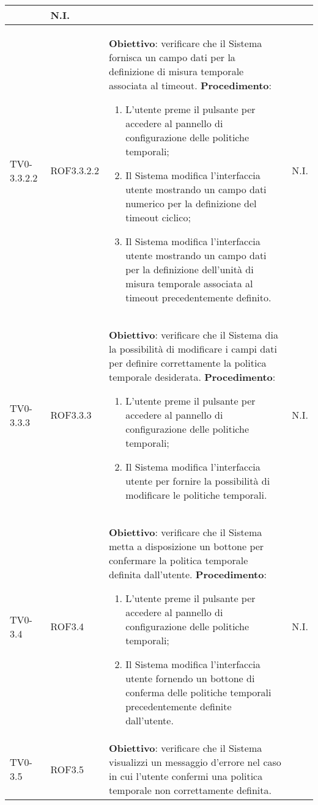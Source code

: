 \begin{longtable}{|C{.15\textwidth}|C{.13\textwidth}|m{.52\textwidth}|C{.08\textwidth}|}
	& N.I. \\
\hline
TV0-3.3.2.2 & ROF3.3.2.2 &
	\textbf{Obiettivo}: verificare che il Sistema fornisca un campo dati per la definizione di misura temporale associata al timeout. \newline
	\textbf{Procedimento}:
	\begin{enumerate}
		\item L'utente preme il pulsante per accedere al pannello di configurazione delle politiche temporali;
		\item Il Sistema modifica l'interfaccia utente mostrando un campo dati numerico per la definizione del timeout ciclico;
		\item Il Sistema modifica l'interfaccia utente mostrando un campo dati per la definizione dell'unità di misura temporale associata al timeout precedentemente definito.
	\end{enumerate}
	& N.I. \\
\hline
{} TV0-3.3.3 & ROF3.3.3 &
	\textbf{Obiettivo}: verificare che il Sistema dia la possibilità di modificare i campi dati per definire correttamente la politica temporale desiderata. \newline
	\textbf{Procedimento}:
	\begin{enumerate}
		\item L'utente preme il pulsante per accedere al pannello di configurazione delle politiche temporali;
		\item Il Sistema modifica l'interfaccia utente per fornire la possibilità di modificare le politiche temporali.
	\end{enumerate}
	& N.I. \\
\hline
TV0-3.4 & ROF3.4 &
	\textbf{Obiettivo}: verificare che il Sistema metta a disposizione un bottone per confermare la politica temporale definita dall'utente. \newline
	\textbf{Procedimento}:
	\begin{enumerate}
		\item L'utente preme il pulsante per accedere al pannello di configurazione delle politiche temporali;
		\item Il Sistema modifica l'interfaccia utente fornendo un bottone di conferma delle politiche temporali precedentemente definite dall'utente.
	\end{enumerate}
	& N.I. \\
\hline
{} TV0-3.5 & ROF3.5 &
	\textbf{Obiettivo}: verificare che il Sistema visualizzi un messaggio d'errore nel caso in cui l'utente confermi una politica temporale non correttamente definita. \newline

\end{longtable}
